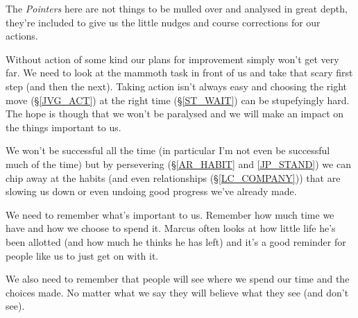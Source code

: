 \cleardoublepage
\begin{multicols}{2}

The \emph{Pointers} here are not things to be mulled over and analysed in great depth, they're included to give us the little nudges and course corrections for our actions.

Without action of some kind our plans for improvement simply won't get very far. We need to look at the mammoth task in front of us and take that scary first step (and then the next). 
Taking action isn't always easy and choosing the right move (\S \ref{JVG_ACT}) at the right time (\S \ref{ST_WAIT}) can be stupefyingly hard.
The hope is though that we won't be paralysed and we will make an impact on the things important to us.

We won't be successful all the time (in particular I'm not even be successful much of the time) but by persevering (\S \ref{AR_HABIT} and \ref{JP_STAND}) we can chip away at the habits (and even relationships (\S \ref{LC_COMPANY})) that are slowing us down or even undoing good progress we've already made.

We need to remember what's important to us. Remember how much time we have and how we choose to spend it. Marcus often looks at how little life he's been allotted (and how much he thinks he has left) and it's a good reminder for people like us to just get on with it.

We also need to remember that people will see where we spend our time and the choices made. No matter what we say they will believe what they see (and don't see). 

\end{multicols}
